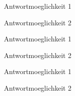 
\begin{questmclist}
  \item Antwortmoeglichkeit 1
  \item Antwortmoeglichkeit 2
\end{questmclist}


\begin{questmclist}[2ex]
  \item Antwortmoeglichkeit 1
  \item Antwortmoeglichkeit 2
\end{questmclist}


\begin{questmclistalph}
  \item Antwortmoeglichkeit 1
  \item Antwortmoeglichkeit 2
\end{questmclistalph}
